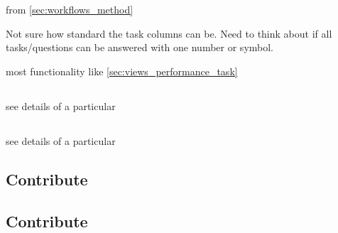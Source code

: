 from \cref{sec:workflows_method}

Not sure how standard the task columns can be.
Need to think about if all tasks/questions can be answered with one number or symbol.

most functionality like \cref{sec:views_performance_task}

\subsection{\Element}

see details of a particular \Element

\subsection{\Method}

see details of a particular \Method

\subsection{Contribute \Element}

\subsection{Contribute \Method}
